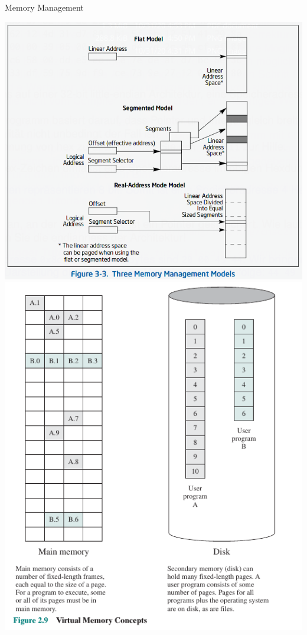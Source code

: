 \documentclass[10pt]{beamer}
\begin{document}
\begin{frame}[allowframebreaks]{Memory Management}
\begin{center}
    \includegraphics[keepaspectratio, width=\textwidth, height=\textheight-2\baselineskip-2\baselineskip]{img/012_mem_model.png} \\ \framebreak
    \includegraphics[keepaspectratio, width=\textwidth, height=\textheight-2\baselineskip-2\baselineskip]{img/012_paging.png} \\ \framebreak

\end{center}
\end{frame}
\end{document}
